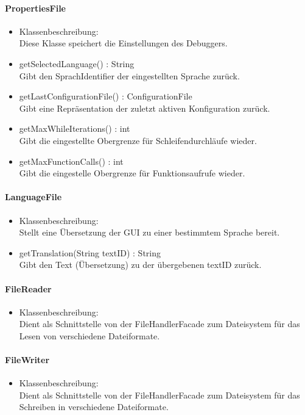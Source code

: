\documentclass[parskip=full]{scrartcl}
\begin{document}
\paragraph{PropertiesFile}
\begin{itemize}
\item Klassenbeschreibung: \\
Diese Klasse speichert die Einstellungen des Debuggers.
\item getSelectedLanguage() : String \\
Gibt den SprachIdentifier der eingestellten Sprache zurück.
\item getLastConfigurationFile() : ConfigurationFile \\
Gibt eine Repräsentation der zuletzt aktiven Konfiguration zurück.
\item getMaxWhileIterations() : int \\
Gibt die eingestellte Obergrenze für Schleifendurchläufe wieder.
\item getMaxFunctionCalls() : int \\
Gibt die eingestelle Obergrenze für Funktionsaufrufe wieder.
\end{itemize}

\paragraph{LanguageFile}
\begin{itemize}
\item Klassenbeschreibung: \\
Stellt eine Übersetzung der GUI zu einer bestimmtem Sprache bereit.
\item getTranslation(String textID) : String \\
Gibt den Text (Übersetzung) zu der übergebenen textID zurück.
\end{itemize}

\paragraph{FileReader}%
\begin{itemize}
\item Klassenbeschreibung: \\
Dient als Schnittstelle von der FileHandlerFacade zum Dateisystem für das Lesen von verschiedene Dateiformate.
\end{itemize}

\paragraph{FileWriter}%
\begin{itemize}
\item Klassenbeschreibung: \\
Dient als Schnittstelle von der FileHandlerFacade zum Dateisystem für das Schreiben in verschiedene Dateiformate.
\end{itemize}
\end{document}
